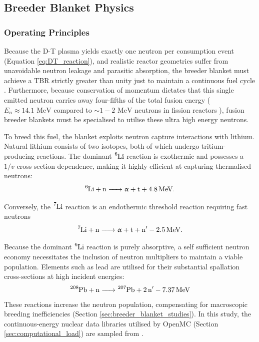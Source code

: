 \documentclass[11pt]{article}
\begin{document}
\subsection{Breeder Blanket Physics}
\subsubsection{Operating Principles}
\label{sec:theory_main}
Because the D-T plasma yields exactly one neutron per consumption event (Equation
\ref{eq:DT_reaction}), and realistic reactor geometries suffer from unavoidable neutron leakage and
parasitic absorption, the breeder blanket must achieve a TBR strictly greater than unity just to
maintain a continuous fuel cycle \citep{pearson_tritium_2018,khan_mphys_sem1}. Furthermore, because
conservation of momentum dictates that this single emitted neutron carries away four-fifths of the
total fusion energy ($E_n \approx 14.1 \text{ MeV}$ compared to $\sim 1-2 \text{ MeV}$ neutrons in
fission reactors \citep{heckrotte_factors_1971}), fusion breeder blankets must be specialised to
utilise these ultra high energy neutrons.

To breed this fuel, the blanket exploits neutron capture interactions with lithium. Natural lithium
consists of two isotopes, both of which undergo tritium-producing reactions. The dominant
$\ce{^{6}Li}$ reaction is exothermic and possesses a $1/v$ cross-section dependence, making it
highly efficient at capturing thermalised neutrons:
\begin{equation}
    \ce{^6Li + n -> \upalpha} + \ce{t + 4.8 MeV}.
    \label{eq:Li6_reaction}
\end{equation}

Conversely, the $\ce{^{7}Li}$ reaction is an endothermic threshold reaction requiring fast neutrons
\begin{equation}
    \ce{^7Li + n -> \upalpha} + \ce{t + n^\prime{}} - \ce{2.5 MeV}.
    \label{eq:Li7_reaction}
\end{equation}

Because the dominant $\ce{^{6}Li}$ reaction is purely absorptive, a self sufficient neutron economy
necessitates the inclusion of neutron multipliers to maintain a viable population. Elements such as
lead are utilised for their substantial spallation  cross-sections at high incident
energies:
 \begin{equation}
    \ce{^{208}Pb + n -> ^{207}Pb + 2n^\prime{} - 7.37MeV}
    \label{eq:Pb_spallation}
\end{equation}
These reactions increase the neutron population, compensating for macroscopic breeding
inefficiencies (Section \ref{sec:breeder_blanket_studies}). In this study, the continuous-energy
nuclear data libraries utilised by OpenMC (Section \ref{sec:computational_load}) are sampled from
\cite{brown_endfb-viii0_2018}.
\end{document}
